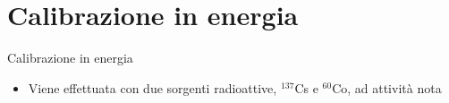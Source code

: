 \documentclass [xcolor=svgnames] {beamer}
\begin{document}
\section{Calibrazione in energia}
\begin{frame}{Calibrazione in energia}
	\begin{itemize}
		\item Viene effettuata con due sorgenti radioattive, $^{137}$Cs e $^{60}$Co, ad attività nota
	\end{itemize}
	
	\vspace{5mm} %
	

\end{frame}
\end{document}
